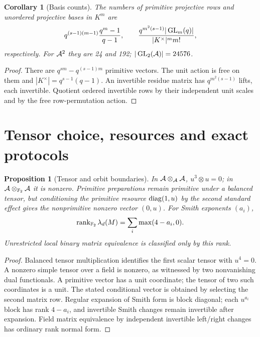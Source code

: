 \documentclass[11pt]{article}
\newtheorem{proposition}[theorem]{Proposition}
\newtheorem{corollary}[theorem]{Corollary}
\theoremstyle{remark}
\begin{document}
\begin{corollary}[Basis counts]
The numbers of primitive projective rows and unordered projective bases in
$K^m$ are
\[
 q^{(s-1)(m-1)}\frac{q^m-1}{q-1},\qquad
 \frac{q^{m^2(s-1)}|\operatorname{GL}_m(q)|}{|K^\times|^m m!},
\]
respectively. For $\mathcal A^2$ they are 24 and 192; $|\operatorname{GL}_2(\mathcal A)|=24576$.
\end{corollary}
\begin{proof}
There are $q^{sm}-q^{(s-1)m}$ primitive vectors. The unit action is free on
them and $|K^\times|=q^{s-1}(q-1)$. An invertible residue matrix has
$q^{m^2(s-1)}$ lifts, each invertible. Quotient ordered invertible rows by their
independent unit scales and by the free row-permutation action.
\end{proof}

\section{Tensor choice, resources and exact protocols}
\label{sec:resources}
\begin{proposition}[Tensor and orbit boundaries]
In $\mathcal A\otimes_\mathcal A\mathcal A$, $u^3\otimes u=0$; in
$\mathcal A\otimes_{\mathbb F_2}\mathcal A$ it is nonzero. Primitive preparations remain primitive
under a balanced tensor, but conditioning the primitive resource
$\operatorname{diag}(1,u)$ by the second standard effect gives the nonprimitive nonzero
vector $(0,u)$. For Smith exponents $(a_i)$,
\[
 \operatorname{rank}_{\mathbb F_2}\lambda_d(M)=\sum_i\max(4-a_i,0).
\]
Unrestricted local binary matrix equivalence is classified only by this rank.
\end{proposition}
\begin{proof}
Balanced tensor multiplication identifies the first scalar tensor with
$u^4=0$. A nonzero simple tensor over a field is nonzero, as witnessed by two
nonvanishing dual functionals. A primitive vector has a unit coordinate;
the tensor of two such coordinates is a unit. The stated conditional vector
is obtained by selecting the second matrix row. Regular expansion of Smith
form is block diagonal; each $u^{a_i}$ block has rank $4-a_i$, and invertible
Smith changes remain invertible after expansion. Field matrix equivalence by
independent invertible left/right changes has ordinary rank normal form.
\end{proof}
\end{document}

